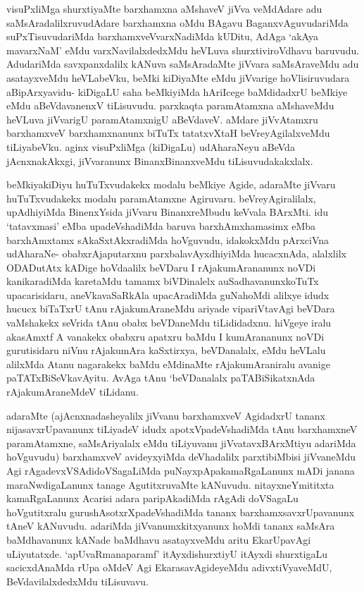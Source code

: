 \begin{artha}
visuPxliMga shurxtiyaMte barxhamxna aMshaveV jiVva veMdAdare adu
saMsAradalilxruvudAdare barxhamxna oMdu BAgavu BaganxvAguvudariMda
suPxTisuvudariMda barxhamxveVvarxNadiMda kUDitu, AdAga `akAya
mavarxNaM' eMdu varxNavilalxdedxMdu heVLuva shurxtiviroVdhavu
baruvudu. AdudariMda savxpanxdalilx kANuva saMsAradaMte jiVvara
saMsAraveMdu adu asatayxveMdu heVLabeVku, beMki kiDiyaMte eMdu
jiVvarige hoVlisiruvudara aBipArxyavidu- kiDigaLU saha beMkiyiMda
hAriIcege baMdidadxrU beMkiye eMdu aBeVdavanenxV tiLisuvudu. parxkaqta
paramAtamxna aMshaveMdu heVLuva jiVvarigU paramAtamxnigU
aBeVdaveV. aMdare jiVvAtamxru barxhamxveV barxhamxnanunx biTuTx
tatatxvXtaH beVreyAgilalxveMdu tiLiyabeVku. aginx visuPxliMga
(kiDigaLu) udAharaNeyu aBeVda jAcnxnakAkxgi, jiVvaranunx
BinanxBinanxveMdu tiLisuvudakakxlalx.
\end{artha}

\begin{artha}
beMkiyakiDiyu huTuTxvudakekx modalu beMkiye Agide, adaraMte jiVvaru
huTuTxvudakekx modalu paramAtamxne Agiruvaru. beVreyAgiralilalx,
upAdhiyiMda BinenxYsida jiVvaru BinanxreMbudu keVvala BArxMti. idu
`tatavxmasi' eMba upadeVshadiMda baruva barxhAmxhamasimx eMba
barxhAmxtamx sAkaSxtAkxradiMda hoVguvudu,  idakokxMdu pArxciVna
udAharaNe- obabxrAjaputarxnu parxbalavAyxdhiyiMda hucacxnAda,
alalxlilx ODADutAtx kADige hoVdaalilx beVDaru I rAjakumArananunx
noVDi kanikaradiMda karetaMdu tamamx biVDinalelx auSadhavanunxkoTuTx
upacarisidaru, aneVkavaSaRkAla upacAradiMda guNahoMdi alilxye idudx
hucucx biTaTxrU tAnu rAjakumAraneMdu ariyade vipariVtavAgi beVDara
vaMshakekx seVrida tAnu obabx beVDaneMdu tiLididadxnu. hiVgeye iralu
akasAmxtf A vanakekx obabxru apatxru baMdu I kumArananunx noVDi
gurutisidaru niVnu rAjakumAra  kaSxtirxya, beVDanalalx, eMdu
heVLalu alilxMda Atanu nagarakekx baMdu eMdinaMte rAjakumAraniralu
avanige paTATxBiSeVkavAyitu. AvAga tAnu `beVDanalalx paTABiSikatxnAda
rAjakumAraneMdeV tiLidanu.
\end{artha}

\begin{artha}
adaraMte (ajAcnxnadasheyalilx jiVvanu barxhamxveV AgidadxrU tananx
nijasavxrUpavanunx tiLiyadeV idudx apotxVpadeVshadiMda tAnu
barxhamxneV paramAtamxne, saMsAriyalalx eMdu tiLiyuvanu jiVvatavxBArxMtiyu
adariMda hoVguvudu) barxhamxveV avideyxyiMda deVhadalilx parxtibiMbisi
jiVvaneMdu Agi rAgadevxVSAdidoVSagaLiMda puNayxpApakamaRgaLanunx mADi
janana maraNwdigaLanunx tanage AgutitxruvaMte
kANuvudu. nitayxneYmititxta kamaRgaLanunx Acarisi adara paripAkadiMda
rAgAdi doVSagaLu hoVgutitxralu gurushAsotxrXpadeVshadiMda tananx
barxhamxsavxrUpavanunx tAneV kANuvudu. adariMda jiVvanumxkitxyanunx
hoMdi tananx saMsAra baMdhavanunx kANade baMdhavu asatayxveMdu aritu
EkarUpavAgi uLiyutatxde. `apUvaRmanaparamf' itAyxdishurxtiyU itAyxdi
shurxtigaLu sacicxdAnaMda rUpa oMdeV Agi EkarasavAgideyeMdu
adivxtiVyaveMdU, BeVdavilalxdedxMdu tiLisuvavu.
\end{artha}
